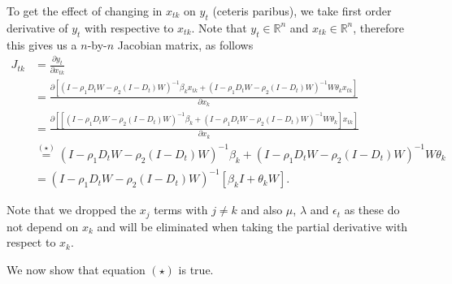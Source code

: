 \documentclass[11pt,a4paper]{amsart}
\theoremstyle{plain}
\theoremstyle{definition}
\begin{document}
To get the effect of changing in $x_{tk}$ on $y_{t}$ (ceteris paribus), we take first order derivative of $y_{t}$ with respective to $x_{tk}$. Note that $y_{t} \in \mathbb{R}^{n}$ and $x_{tk} \in \mathbb{R}^{n}$, therefore this gives us a $n$-by-$n$ Jacobian matrix, as follows
\begin{equation}
	\begin{aligned}
			J_{tk} &= \frac{\partial y_{t}}{\partial x_{tk}} \\
		&= \frac{\partial [ (I-\rho_{1}D_{t}W-\rho_{2}(I-D_{t})W)^{-1}\beta_{k}x_{tk} + (I-\rho_{1}D_{t}W-\rho_{2}(I-D_{t})W)^{-1}W \theta_{k}x_{tk}]}{\partial x_{k}} \\
		&=  \frac{\partial [[ (I-\rho_{1}D_{t}W-\rho_{2}(I-D_{t})W)^{-1}\beta_{k} + (I-\rho_{1}D_{t}W-\rho_{2}(I-D_{t})W)^{-1}W \theta_{k}]x_{tk}]}{\partial x_{k}} \\
		&\stackrel{(\star)}{=} (I-\rho_{1}D_{t}W-\rho_{2}(I-D_{t})W)^{-1}\beta_{k} + (I-\rho_{1}D_{t}W-\rho_{2}(I-D_{t})W)^{-1}W \theta_{k} \\
		&= (I-\rho_{1}D_{t}W-\rho_{2}(I-D_{t})W)^{-1}[\beta_{k} I + \theta_{k} W].
	\end{aligned}
\end{equation}

Note that we dropped the $x_{j}$ terms with $j \ne k$ and also $\mu$, $\lambda$ and $\epsilon_{t}$ as these do not depend on $x_{k}$ and will be eliminated when taking the partial derivative with respect to $x_{k}$. 

We now show that equation $(\star)$ is true. 
\end{document}
